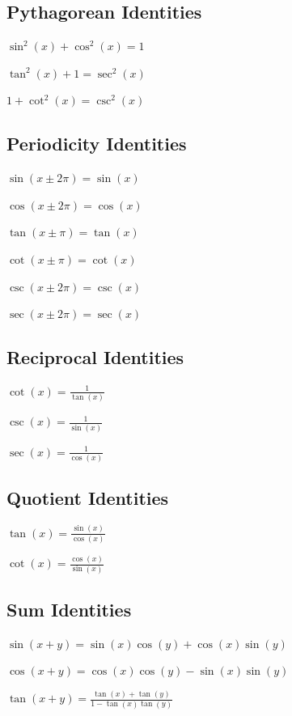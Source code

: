 \documentclass[8pt,a4paper]{extarticle}     %
\theoremstyle{definition}
\theoremstyle{definition}
\theoremstyle{definition}
\begin{document}
\begin{multicols}{4}
\subsection{Pythagorean Identities}
\begin{eqlist}
	\item $\sin^2(x) + \cos^2(x) = 1$
	\item $\tan^2(x) + 1 = \sec^2(x)$
	\item $1 + \cot^2(x) = \csc^2(x)$
\end{eqlist}

\subsection{Periodicity Identities}
\begin{eqlist}
	\item $\sin(x \pm 2\pi) = \sin(x)$
	\item $\cos(x \pm 2\pi) = \cos(x)$
	\item $\tan(x \pm \pi) = \tan(x)$
	\item $\cot(x \pm \pi) = \cot(x)$
	\item $\csc(x \pm 2\pi) = \csc(x)$
	\item $\sec(x \pm 2\pi) = \sec(x)$
\end{eqlist}

\subsection{Reciprocal Identities}
\begin{eqlist}
	\item $\cot(x) = \frac{1}{\tan(x)}$
	\item $\csc(x) = \frac{1}{\sin(x)}$
	\item $\sec(x) = \frac{1}{\cos(x)}$
\end{eqlist}

\subsection{Quotient Identities}
\begin{eqlist}
	\item $\tan(x) = \frac{\sin(x)}{\cos(x)}$
	\item $\cot(x) = \frac{\cos(x)}{\sin(x)}$
\end{eqlist}

\subsection{Sum Identities}
\begin{eqlist}
	\item $\sin(x + y) = \sin(x)\cos(y) + \cos(x)\sin(y)$
	\item $\cos(x + y) = \cos(x)\cos(y) - \sin(x)\sin(y)$
	\item $\tan(x + y) = \frac{\tan(x) + \tan(y)}{1-\tan(x)\tan(y)}$
\end{eqlist}


\end{multicols}
\end{document}
